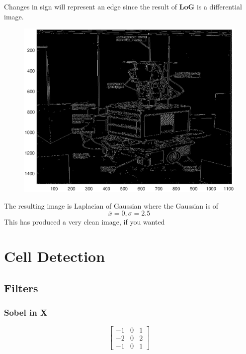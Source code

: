 \documentclass{Resources/UoBLab1}
\begin{document}
Changes in sign will represent an edge since the result of \textbf{LoG} is a differential image.

\begin{figure}
    \begin{center}
        \includegraphics[scale=0.25]{Resources/images/LoG.eps}
        \label{fig:shakey}
    \end{center}
\end{figure}

The resulting image is Laplacian of Gaussian where the Gaussian is of \[\bar{x}=0,\sigma=2.5\]
This has produced a very clean image, if you wanted




\section{Cell Detection}
\subsection{Filters}
\subsubsection{Sobel in X}
\[
\begin{bmatrix}
    -1 & 0 & 1 \\
    -2 & 0 & 2 \\
    -1 & 0 & 1
\end{bmatrix}
\]
\end{document}
